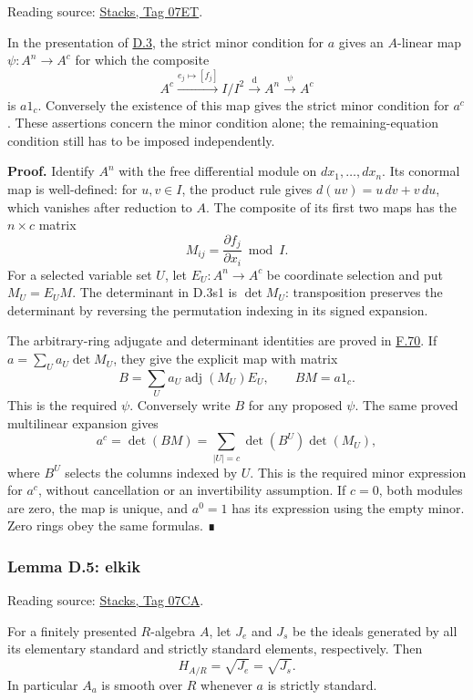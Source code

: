 \documentclass[11pt,a4paper,openany]{report}
\begin{document}
Reading source: \href{https://stacks.math.columbia.edu/tag/07ET}{Stacks, Tag 07ET}.

In the presentation of \hyperref[AG-RG-S05-smoothing-definition-strictly-standard]{D.3}, the strict minor condition for \(a\) gives an \(A\)-linear map \(\psi:A^n\to A^c\) for which the composite \[A^c\xrightarrow{e_j\mapsto[f_j]}I/I^2\xrightarrow{\mathrm d}A^n\xrightarrow{\psi}A^c\] is \(a1_c\). Conversely the existence of this map gives the strict minor condition for \(a^c\). These assertions concern the minor condition alone; the remaining-equation condition still has to be imposed independently.

\textbf{Proof.} Identify \(A^n\) with the free differential module on \(dx_1,\ldots,dx_n\). Its conormal map is well-defined: for \(u,v\in I\), the product rule gives \(d(uv)=u\,dv+v\,du\), which vanishes after reduction to \(A\). The composite of its first two maps has the \(n\times c\) matrix \[M_{ij}=\frac{\partial f_j}{\partial x_i}\bmod I.\] For a selected variable set \(U\), let \(E_U:A^n\to A^c\) be coordinate selection and put \(M_U=E_UM\). The determinant in D.3s1 is \(\det M_U\): transposition preserves the determinant by reversing the permutation indexing in its signed expansion.

The arbitrary-ring adjugate and determinant identities are proved in \hyperref[AG-RG-S05-algebra-lemma-matrix-left-inverse]{F.70}. If \(a=\sum_U a_U\det M_U\), they give the explicit map with matrix \[B=\sum_U a_U\operatorname{adj}(M_U)E_U,\qquad BM=a1_c.\] This is the required \(\psi\). Conversely write \(B\) for any proposed \(\psi\). The same proved multilinear expansion gives \[a^c=\det(BM)=\sum_{|U|=c}\det(B^U)\det(M_U),\] where \(B^U\) selects the columns indexed by \(U\). This is the required minor expression for \(a^c\), without cancellation or an invertibility assumption. If \(c=0\), both modules are zero, the map is unique, and \(a^0=1\) has its expression using the empty minor. Zero rings obey the same formulas. ∎

\label{AG-RG-S05-smoothing-lemma-elkik}

\subsubsection{Lemma D.5: elkik}\label{AG-RG-S05-lemma-d.5-elkik}

Reading source: \href{https://stacks.math.columbia.edu/tag/07CA}{Stacks, Tag 07CA}.

For a finitely presented \(R\)-algebra \(A\), let \(J_e\) and \(J_s\) be the ideals generated by all its elementary standard and strictly standard elements, respectively. Then \[H_{A/R}=\sqrt{J_e}=\sqrt{J_s}.\] In particular \(A_a\) is smooth over \(R\) whenever \(a\) is strictly standard.
\end{document}
